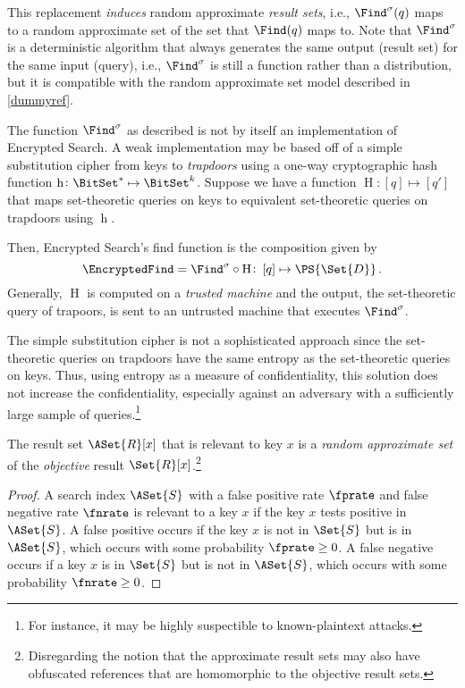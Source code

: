 \documentclass[ ../main.tex]{subfiles}
\begin{document}
This replacement \emph{induces} random approximate \emph{result sets}, i.e., $\Find^\sigma(q)$ maps to a random approximate set of the set that $\Find(q)$ maps to.
Note that $\Find^\sigma$ is a deterministic algorithm that always generates the same output (result set) for the same input (query), i.e., $\Find^\sigma$ is still a function rather than a distribution, but it is compatible with the random approximate set model described in \cref{dummyref}. 

\begin{remark}
The function $\Find^\sigma$ as described is not by itself an implementation of Encrypted Search.
A weak implementation may be based off of a simple substitution cipher from keys to \emph{trapdoors} using a one-way cryptographic hash function $\operatorname{h} \colon \BitSet^* \mapsto \BitSet^k$.
Suppose we have a function $\operatorname{H} \colon [q] \mapsto \left[q'\right]$ that maps set-theoretic queries on keys to equivalent set-theoretic queries on trapdoors using $\operatorname{h}$.

Then, Encrypted Search's find function is the composition given by
\begin{equation}
\EncryptedFind = \Find^\sigma \circ \operatorname{H} \colon \left[q\right] \mapsto \PS{\Set{D}}\,.
\end{equation}
Generally, $\operatorname{H}$ is computed on a \emph{trusted machine} and the output, the set-theoretic query of trapoors, is sent to an untrusted machine that executes $\Find^\sigma$.

The simple substitution cipher is not a sophisticated approach since the set-theoretic queries on trapdoors have the same entropy as the set-theoretic queries on keys.
Thus, using entropy as a measure of confidentiality, this solution does not increase the confidentiality, especially against an adversary with a sufficiently large sample of queries.\footnote{For instance, it may be highly suspectible to known-plaintext attacks.}
\end{remark}

\begin{theorem}
The result set $\ASet{R}[x]$ that is relevant to key $x$ is a \emph{random approximate set} of the \emph{objective} result $\Set{R}[x]$.\footnote{Disregarding the notion that the approximate result sets 
may also have obfuscated references that are homomorphic to the objective 
result sets.}
\end{theorem}
\begin{proof}
A search index $\ASet{S}$ with a false positive rate $\fprate$ and false negative rate $\fnrate$ is relevant to a key $x$ if the key $x$ tests positive in $\ASet{S}$. A false positive occurs if the key $x$ is not in $\Set{S}$ but is in $\ASet{S}$, which occurs with some probability $\fprate \geq 0$. A false negative occurs if a key $x$ is in $\Set{S}$ but is not in $\ASet{S}$, which occurs with some probability $\fnrate \geq 0$.
\end{proof}
\end{document}
